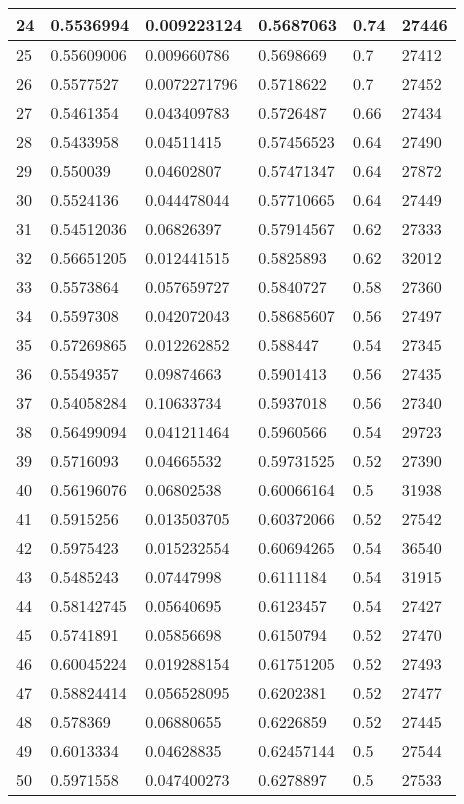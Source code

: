 \begin{longtable}{|l|l|l|l|l|l|}
24 & 0.5536994 & 0.009223124 & 0.5687063 & 0.74 & 27446 \\ \hline 
25 & 0.55609006 & 0.009660786 & 0.5698669 & 0.7 & 27412 \\ \hline 
26 & 0.5577527 & 0.0072271796 & 0.5718622 & 0.7 & 27452 \\ \hline 
27 & 0.5461354 & 0.043409783 & 0.5726487 & 0.66 & 27434 \\ \hline 
28 & 0.5433958 & 0.04511415 & 0.57456523 & 0.64 & 27490 \\ \hline 
29 & 0.550039 & 0.04602807 & 0.57471347 & 0.64 & 27872 \\ \hline 
30 & 0.5524136 & 0.044478044 & 0.57710665 & 0.64 & 27449 \\ \hline 
31 & 0.54512036 & 0.06826397 & 0.57914567 & 0.62 & 27333 \\ \hline 
32 & 0.56651205 & 0.012441515 & 0.5825893 & 0.62 & 32012 \\ \hline 
33 & 0.5573864 & 0.057659727 & 0.5840727 & 0.58 & 27360 \\ \hline 
34 & 0.5597308 & 0.042072043 & 0.58685607 & 0.56 & 27497 \\ \hline 
35 & 0.57269865 & 0.012262852 & 0.588447 & 0.54 & 27345 \\ \hline 
36 & 0.5549357 & 0.09874663 & 0.5901413 & 0.56 & 27435 \\ \hline 
37 & 0.54058284 & 0.10633734 & 0.5937018 & 0.56 & 27340 \\ \hline 
38 & 0.56499094 & 0.041211464 & 0.5960566 & 0.54 & 29723 \\ \hline 
39 & 0.5716093 & 0.04665532 & 0.59731525 & 0.52 & 27390 \\ \hline 
40 & 0.56196076 & 0.06802538 & 0.60066164 & 0.5 & 31938 \\ \hline 
41 & 0.5915256 & 0.013503705 & 0.60372066 & 0.52 & 27542 \\ \hline 
42 & 0.5975423 & 0.015232554 & 0.60694265 & 0.54 & 36540 \\ \hline 
43 & 0.5485243 & 0.07447998 & 0.6111184 & 0.54 & 31915 \\ \hline 
44 & 0.58142745 & 0.05640695 & 0.6123457 & 0.54 & 27427 \\ \hline 
45 & 0.5741891 & 0.05856698 & 0.6150794 & 0.52 & 27470 \\ \hline 
46 & 0.60045224 & 0.019288154 & 0.61751205 & 0.52 & 27493 \\ \hline 
47 & 0.58824414 & 0.056528095 & 0.6202381 & 0.52 & 27477 \\ \hline 
48 & 0.578369 & 0.06880655 & 0.6226859 & 0.52 & 27445 \\ \hline 
49 & 0.6013334 & 0.04628835 & 0.62457144 & 0.5 & 27544 \\ \hline 
50 & 0.5971558 & 0.047400273 & 0.6278897 & 0.5 & 27533 \\ \hline 
\end{longtable}